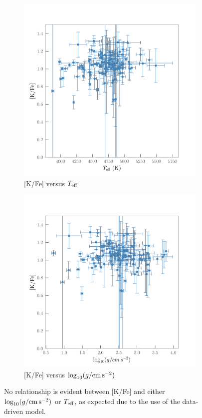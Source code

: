 \documentclass[a4paper,fleqn,usenatbib]{mnras}
\newcommand{\teff}{T_{\rm eff}}
\newcommand{\logg}{\log_{10}(g/{\rm cm\,s}^{-2})}
\begin{document}
\begin{figure}

\begin{subfigure}{0.5\textwidth}
\includegraphics[width=\columnwidth]{KvsTeff.png}
\caption{[K/Fe] versus $\teff$}
\label{KvsTeff}
\end{subfigure}

\begin{subfigure}{0.5\textwidth}
\includegraphics[width=\columnwidth]{Kvslogg.png}
\caption{[K/Fe] versus $\logg$}
\label{Kvslogg}
\end{subfigure}
\caption{No relationship is evident between [K/Fe] and either $\logg$ or $\teff$, as expected due to the use of the data-driven model.}
\end{figure}
\end{document}
